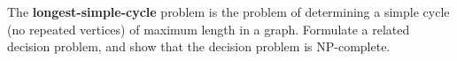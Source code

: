 The \textbf{longest-simple-cycle} problem is the problem of determining a simple cycle 
(no repeated vertices) of maximum length in a graph. Formulate a related decision 
problem, and show that the decision problem is NP-complete.